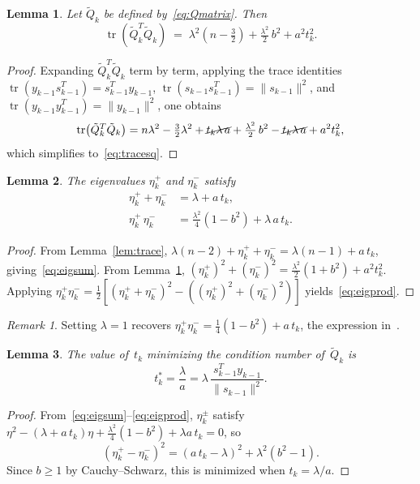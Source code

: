 \documentclass{article}
\theoremstyle{plain}
\newtheorem{lemma}{Lemma}
\theoremstyle{definition}
\theoremstyle{remark}
\newtheorem{remark}{Remark}
\newcommand{\norm}[1]{\|#1\|}
\DeclareMathOperator{\tr}{tr}
\newcommand{\tstar}{t_k^*}                                 %
\begin{document}
\begin{lemma}\label{lem:tracesq}
Let $\tilde{Q}_k$ be defined by~\eqref{eq:Qmatrix}. Then
\begin{equation}\label{eq:tracesq}
  \tr\!\left(\tilde{Q}_k^T \tilde{Q}_k\right)
  \;=\; \lambda^2\!\left(n - \tfrac{3}{2}\right)
    + \tfrac{\lambda^2}{2}\,b^2
    + a^2 t_k^2.
\end{equation}
\end{lemma}
\begin{proof}
Expanding $\tilde{Q}_k^T \tilde{Q}_k$ term by term, applying the trace identities $\tr(y_{k-1}s_{k-1}^T) = s_{k-1}^T y_{k-1}$, $\tr(s_{k-1}s_{k-1}^T) = \norm{s_{k-1}}^2$, and $\tr(y_{k-1}y_{k-1}^T) = \norm{y_{k-1}}^2$, one obtains
\[
  \tr\!\left(\tilde{Q}_k^T \tilde{Q}_k\right)
  = n\lambda^2 - \tfrac{3}{2}\lambda^2
    + \cancel{t_k\lambda\,a}
    + \tfrac{\lambda^2}{2}\,b^2
    - \cancel{t_k\lambda\,a}
    + a^2 t_k^2,
\]
which simplifies to~\eqref{eq:tracesq}.
\end{proof}

\begin{lemma}\label{lem:eigenproduct}
The eigenvalues $\eta_k^+$ and $\eta_k^-$ satisfy
\begin{align}
  \eta_k^+ + \eta_k^- &= \lambda + a\, t_k, \label{eq:eigsum}\\
  \eta_k^+\, \eta_k^- &= \tfrac{\lambda^2}{4}(1 - b^2) + \lambda\, a\, t_k. \label{eq:eigprod}
\end{align}
\end{lemma}
\begin{proof}
From Lemma~\ref{lem:trace}, $\lambda(n{-}2) + \eta_k^+ + \eta_k^- = \lambda(n{-}1) + a\,t_k$, giving~\eqref{eq:eigsum}. From Lemma~\ref{lem:tracesq}, $(\eta_k^+)^2 + (\eta_k^-)^2 = \frac{\lambda^2}{2}(1 + b^2) + a^2 t_k^2$. Applying $\eta_k^+\eta_k^- = \frac{1}{2}[(\eta_k^+ + \eta_k^-)^2 - ((\eta_k^+)^2 + (\eta_k^-)^2)]$ yields~\eqref{eq:eigprod}.
\end{proof}

\begin{remark}\label{rem:specialcase1}
Setting $\lambda = 1$ recovers $\eta_k^+\eta_k^- = \frac{1}{4}(1 - b^2) + a\,t_k$, the expression in~\cite{sabi2023modified}.
\end{remark}

\begin{lemma}\label{lem:optimalt}
The value of~$t_k$ minimizing the condition number of~$\tilde{Q}_k$ is
\begin{equation}\label{eq:tstar}
  \tstar = \frac{\lambda}{a} = \lambda\,\frac{s_{k-1}^T y_{k-1}}{\norm{s_{k-1}}^2}.
\end{equation}
\end{lemma}
\begin{proof}
From~\eqref{eq:eigsum}--\eqref{eq:eigprod}, $\eta_k^\pm$ satisfy $\eta^2 - (\lambda + a\,t_k)\eta + \frac{\lambda^2}{4}(1-b^2) + \lambda a\,t_k = 0$, so
\[
  (\eta_k^+ - \eta_k^-)^2 = (a\,t_k - \lambda)^2 + \lambda^2(b^2 - 1).
\]
Since $b \geq 1$ by Cauchy--Schwarz, this is minimized when $t_k = \lambda/a$.
\end{proof}
\end{document}
